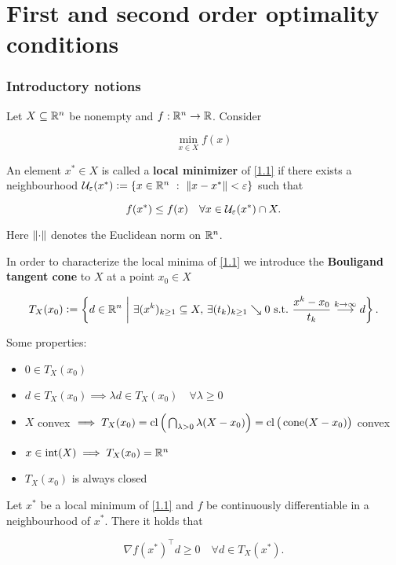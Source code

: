 \part{First and second order optimality conditions}

\section{Introductory notions}

Let \(X \subseteq \mathbb{R}^n\) be nonempty and \(f : \mathbb{R}^n \to \mathbb{R}\). Consider

\begin{equation}\label{1.1}
    \min_{x \in X} f(x)
\end{equation}

An element \(x^* \in X\) is called a \textbf{local minimizer} of \eqref{1.1} if there exists a neighbourhood \(\mathcal{U}_\varepsilon(x^*) \mathrel{\mathop:}= \{ x \in \mathbb{R}^n \ : \ \left\| x - x^* \right\| < \varepsilon \}\) such that

\begin{equation}\label{1.2}
    f(x^*) \le f(x) \quad \forall x \in \mathcal{U}_\varepsilon(x^*) \cap X.
\end{equation}

Here \(\left\| \cdot \right\|\) denotes the Euclidean norm on \(\mathbb{R}^n\).

In order to characterize the local minima of \eqref{1.1} we introduce the \textbf{Bouligand tangent cone} to \(X\) at a point \(x_0 \in X\)

\[T_X(x_0) \defeq \left\{ d \in \R^n \ \middle| \ \exists (x^k)_{k \ge 1} \subseteq X ,\, \exists (t_k)_{k \ge 1} \searrow 0 \ \mathrm{s. t.} \ \frac{x^k - x_0}{t_k} \stackrel{k \to \infty}{\longrightarrow} d \right\}.\]

Some properties:

\begin{itemize}
    \item \(0 \in T_X(x_0)\)
    \item \(d \in T_X(x_0) \implies \lambda d \in T_X(x_0) \quad \forall \lambda \ge 0\)
    \item \(X\) convex \(\implies T_X(x_0) = \operatorname{cl}\Big(\bigcap_{\lambda > 0} \lambda (X - x_0)\Big) = \operatorname{cl}\big(\operatorname{cone}(X - x_0)\big)\) convex
    \item \(x \in \operatorname{int}(X) \implies T_X(x_0) = \mathbb{R}^n\)
    \item \(T_X(x_0)\) is always closed
\end{itemize}

\begin{proposition}\label{prop1.1}
    Let \(x^*\) be a local minimum of \eqref{1.1} and \(f\) be continuously differentiable in a neighbourhood of \(x^*\). There it holds that

    \begin{equation}\label{1.3}
        \nabla f(x^*)^\top d \ge 0 \quad \forall d \in T_X(x^*).
    \end{equation}
\end{proposition}
